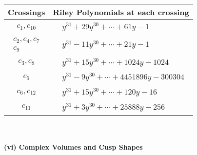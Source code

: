 \documentclass[1p]{elsarticle_modified}
\theoremstyle{definition}
\begin{document}
\begin{tabular}{m{50pt}|m{274pt}}
Crossings & \hspace{64pt}Riley Polynomials at each crossing \\
\hline $$\begin{aligned}c_{1},c_{10}\end{aligned}$$&$\begin{aligned}
&y^{31}+29 y^{30}+\cdots+61 y-1
\end{aligned}$\\
\hline $$\begin{aligned}c_{2},c_{4},c_{7}\\c_{9}\end{aligned}$$&$\begin{aligned}
&y^{31}-11 y^{30}+\cdots+21 y-1
\end{aligned}$\\
\hline $$\begin{aligned}c_{3},c_{8}\end{aligned}$$&$\begin{aligned}
&y^{31}+15 y^{30}+\cdots+1024 y-1024
\end{aligned}$\\
\hline $$\begin{aligned}c_{5}\end{aligned}$$&$\begin{aligned}
&y^{31}-9 y^{30}+\cdots+4451896 y-300304
\end{aligned}$\\
\hline $$\begin{aligned}c_{6},c_{12}\end{aligned}$$&$\begin{aligned}
&y^{31}+15 y^{30}+\cdots+120 y-16
\end{aligned}$\\
\hline $$\begin{aligned}c_{11}\end{aligned}$$&$\begin{aligned}
&y^{31}+3 y^{30}+\cdots+25888 y-256
\end{aligned}$\\
\hline
\end{tabular}\\~\\
\newpage\flushleft \textbf{(vi) Complex Volumes and Cusp Shapes}
\end{document}
